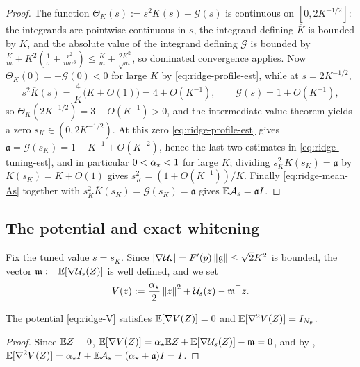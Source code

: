 \begin{proof}
The function $\Theta_K(s):=s^2\overline K(s)-\mathcal G(s)$ is continuous on
$[0,2K^{-1/2}]$: the integrands are pointwise continuous in $s$, the integrand defining
$\overline K$ is bounded by $K$, and the absolute value of the integrand defining
$\mathcal G$ is bounded by $\tfrac Km+K^2(\tfrac1\sigma+\tfrac{r^2}{m\sigma^3})\leq\tfrac Km+\tfrac{2K^2}{\sqrt m}$,
so dominated convergence applies. Now $\Theta_K(0)=-\mathcal G(0)<0$ for large $K$ by
\eqref{eq:ridge-profile-est}, while at $s=2K^{-1/2}$,
\[
    s^2\overline K(s)=\frac4K\bigl(K+O(1)\bigr)=4+O(K^{-1}),
    \qquad
    \mathcal G(s)=1+O(K^{-1}),
\]
so $\Theta_K(2K^{-1/2})=3+O(K^{-1})>0$, and the intermediate value theorem yields a zero
$s_K\in(0,2K^{-1/2})$. At this zero \eqref{eq:ridge-profile-est} gives
$\mathfrak a=\mathcal G(s_K)=1-K^{-1}+O(K^{-2})$, hence the last two estimates in
\eqref{eq:ridge-tuning-est}, and in particular $0<\alpha_\star<1$ for large $K$; dividing
$s_K^2\overline K(s_K)=\mathfrak a$ by $\overline K(s_K)=K+O(1)$ gives
$s_K^2=(1+O(K^{-1}))/K$. Finally \eqref{eq:ridge-mean-As} together with
$s_K^2\overline K(s_K)=\mathcal G(s_K)=\mathfrak a$ gives $\mathbb{E}\mathcal A_s=\mathfrak aI$.
\end{proof}

\subsection{The potential and exact whitening}

Fix the tuned value $s=s_K$. Since $\left\lvert \nabla\mathcal U_s\right\rvert=F'(p)\left\lVert \mathfrak g\right\rVert\leq\sqrt2K^2$
is bounded, the vector $\mathfrak m:=\mathbb{E}[\nabla\mathcal U_s(Z)]$ is well defined, and we set
\begin{equation}
\label{eq:ridge-V}
    V(z):=\frac{\alpha_\star}2\left\lVert z\right\rVert^2+\mathcal U_s(z)-\mathfrak m^\top z .
\end{equation}

\begin{lemma}
\label{lem:ridge-whitening}
The potential \eqref{eq:ridge-V} satisfies $\mathbb{E}[\nabla V(Z)]=0$ and $\mathbb{E}[\nabla^2V(Z)]=I_{N_\theta}$.
\end{lemma}

\begin{proof}
Since $\mathbb{E} Z=0$, $\mathbb{E}[\nabla V(Z)]=\alpha_\star\mathbb{E} Z+\mathbb{E}[\nabla\mathcal U_s(Z)]-\mathfrak m=0$, and by
,
$\mathbb{E}[\nabla^2V(Z)]=\alpha_\star I+\mathbb{E}\mathcal A_s=(\alpha_\star+\mathfrak a)I=I$.
\end{proof}

